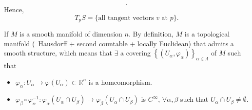 \begin{enumerate}[(1)]
\begin{itemize}
\[        .\]
        Hence,
        \[
            T_p S=\{\text{all tangent vectors }v\text{ at }p\}.    
        \]
    \end{itemize}
    \begin{remark}
        If \(M\) is a smooth manifold of dimension \(n\). By definition,
        \(M\) is a topological manifold (\ie\ Hausdorff + second countable 
        + locally Euclidean) that admits a smooth structure, which means 
        that \(\exists\) a covering \(\left\{(U_\alpha,\varphi_\alpha)
        \right\}_{\alpha\in \Lambda}\) of \(M\) such that
        \begin{itemize}
            \item \(\varphi_\alpha\colon U_\alpha\to \varphi
            \left(U_\alpha\right)\subset \mathbb{R}^n\) is a 
            homeomorphism.
            \item \(\varphi_\beta\circ \varphi_\alpha^{-1}\colon
            \varphi_\alpha\left(U_\alpha\cap U_\beta\right)
            \to \varphi_\beta\left(U_\alpha\cap U_\beta\right)
            \)
            is \(C^\infty\), \(\forall\alpha,\beta\) such that 
            \(U_\alpha\cap U_\beta\neq \emptyset\).
        \end{itemize}
        \begin{center}
            



\begin{tikzpicture}[x=0.75pt,y=0.75pt,yscale=-1,xscale=1]


\end{tikzpicture}
\end{center}
\end{remark}
\end{enumerate}
